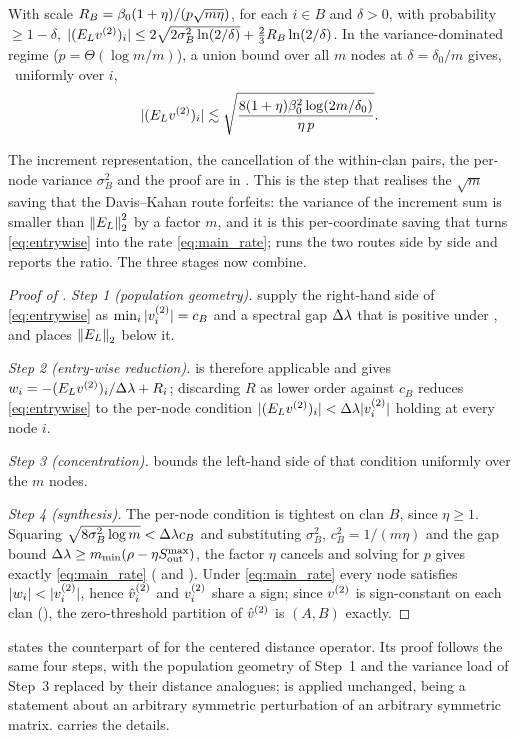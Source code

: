 \begin{lemma}\label{lem:pernode}
With scale $R_B=\beta_0(1+\eta)/(p\sqrt{m\eta})$, for each $i\in B$ and $\delta>0$,
with probability $\ge1-\delta$,
$|(E_{L}v^{(2)})_i|\le2\sqrt{2\sigma_B^2\ln(2/\delta)}+\tfrac23R_B\ln(2/\delta)$. In the
variance-dominated regime ($p=\Theta(\log m/m)$), a union bound over all $m$ nodes
at $\delta=\delta_0/m$ gives, \hp\ uniformly over $i$,
\begin{equation}\label{eq:concentration-bound}
   |(E_{L}v^{(2)})_i|\lesssim\sqrt{\frac{8(1+\eta)\beta_0^2\log(2m/\delta_0)}{\eta\,p}}.
\end{equation}
\end{lemma}
\noindent The increment representation, the cancellation of the within-clan
pairs, the per-node variance $\sigma_B^2$ and the proof are in
. This is the step that realises the $\sqrt m$ saving that the
Davis--Kahan route forfeits: the variance of the increment sum is smaller than
$\left\lVert E_{L} \right\rVert_{2}^2$ by a factor $m$, and it is this per-coordinate saving that turns
\eqref{eq:entrywise} into the rate \eqref{eq:main_rate};  runs
the two routes side by side and  reports the ratio. The three
stages now combine.

\begin{proof}[Proof of ]
\emph{Step 1 (population geometry).}  supply the
right-hand side of \eqref{eq:entrywise} as $\min_i|v^{(2)}_i|=c_B$ and a spectral gap
$\Delta\lambda$ that is positive under , and 
places $\left\lVert E_{L} \right\rVert_{2}$ below it.

\emph{Step 2 (entry-wise reduction).}  is therefore applicable
and gives $w_i=-(E_{L}v^{(2)})_i/\Delta\lambda+R_i$; discarding $R$ as lower order against
$c_B$ reduces \eqref{eq:entrywise} to the per-node condition
$|(E_{L}v^{(2)})_i|<\Delta\lambda|v^{(2)}_i|$ holding at every node $i$.

\emph{Step 3 (concentration).}  bounds the left-hand side of
that condition uniformly over the $m$ nodes.

\emph{Step 4 (synthesis).} The per-node condition is tightest on clan $B$, since
$\eta\ge1$. Squaring $\sqrt{8\sigma_B^2\log m}<\Delta\lambda c_B$ and substituting
$\sigma_B^2$, $c_B^2=1/(m\eta)$ and the gap bound
$\Delta\lambda\ge m_{\min}(\rho-\eta S_{\mathrm{out}}^{\max})$, the factor $\eta$ cancels and solving
for $p$ gives exactly \eqref{eq:main_rate}
( and ). Under \eqref{eq:main_rate} every node satisfies
$|w_i|<|\vv_i|$, hence $\hat v^{(2)}_i$ and $v^{(2)}_i$ share a sign; since $v^{(2)}$ is
sign-constant on each clan (), the zero-threshold partition of
$\hat v^{(2)}$ is $(A,B)$ exactly.
\end{proof}

 states the counterpart of  for the centered
distance operator. Its proof follows the same four steps, with the population
geometry of Step~1 and the variance load of Step~3 replaced by their distance
analogues; 
is applied unchanged, being a statement about an arbitrary symmetric perturbation
of an arbitrary symmetric matrix.  carries the details.
